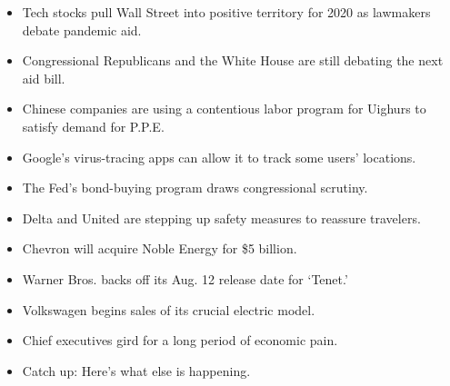 \begin{itemize}
\item
  \protect\hyperlink{tech-stocks-pull-wall-street-into-positive-territory-for-2020-as-lawmakers-debate-pandemic-aid}{}

  Tech stocks pull Wall Street into positive territory for 2020 as
  lawmakers debate pandemic aid.
\item
  \protect\hyperlink{congressional-republicans-and-the-white-house-are-still-debating-the-next-aid-bill}{}

  Congressional Republicans and the White House are still debating the
  next aid bill.
\item
  \protect\hyperlink{chinese-companies-are-using-a-contentious-labor-program-for-uighurs-to-satisfy-demand-for-ppe}{}

  Chinese companies are using a contentious labor program for Uighurs to
  satisfy demand for P.P.E.
\item
  \protect\hyperlink{googles-virus-tracing-apps-can-allow-it-to-track-some-users-locations}{}

  Google's virus-tracing apps can allow it to track some users'
  locations.
\item
  \protect\hyperlink{the-feds-bond-buying-program-draws-congressional-scrutiny}{}

  The Fed's bond-buying program draws congressional scrutiny.
\item
  \protect\hyperlink{delta-and-united-are-stepping-up-safety-measures-to-reassure-travelers}{}

  Delta and United are stepping up safety measures to reassure
  travelers.
\item
  \protect\hyperlink{chevron-will-acquire-noble-energy-for-5-billion}{}

  Chevron will acquire Noble Energy for \$5 billion.
\item
  \protect\hyperlink{warner-bros-backs-off-its-aug-12-release-date-for-tenet}{}

  Warner Bros. backs off its Aug. 12 release date for `Tenet.'
\item
  \protect\hyperlink{volkswagen-begins-sales-of-its-crucial-electric-model}{}

  Volkswagen begins sales of its crucial electric model.
\item
  \protect\hyperlink{chief-executives-gird-for-a-long-period-of-economic-pain}{}

  Chief executives gird for a long period of economic pain.
\item
  \protect\hyperlink{catch-up-heres-what-else-is-happening}{}

  Catch up: Here's what else is happening.
\end{itemize}


